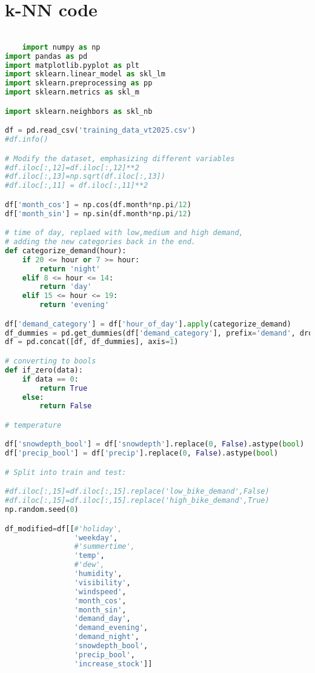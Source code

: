 \section*{k-NN code}
\begin{lstlisting}[language = Python]

    import numpy as np
import pandas as pd
import matplotlib.pyplot as plt
import sklearn.linear_model as skl_lm
import sklearn.preprocessing as pp
import sklearn.metrics as skl_m

import sklearn.neighbors as skl_nb

df = pd.read_csv('training_data_vt2025.csv')
#df.info()

# Modify the dataset, emphasizing different variables
#df.iloc[:,12]=df.iloc[:,12]**2
#df.iloc[:,13]=np.sqrt(df.iloc[:,13])
#df.iloc[:,11] = df.iloc[:,11]**2

df['month_cos'] = np.cos(df.month*np.pi/12)
df['month_sin'] = np.sin(df.month*np.pi/12)

# time of day, replaed with low,medium and high demand, 
# adding the new categories back in the end.
def categorize_demand(hour):
    if 20 <= hour or 7 >= hour:
        return 'night'
    elif 8 <= hour <= 14:
        return 'day'
    elif 15 <= hour <= 19:
        return 'evening'

df['demand_category'] = df['hour_of_day'].apply(categorize_demand)
df_dummies = pd.get_dummies(df['demand_category'], prefix='demand', drop_first=False)
df = pd.concat([df, df_dummies], axis=1)

# converting to bools
def if_zero(data):
    if data == 0:
        return True
    else:
        return False

# temperature

df['snowdepth_bool'] = df['snowdepth'].replace(0, False).astype(bool)
df['precip_bool'] = df['precip'].replace(0, False).astype(bool)

# Split into train and test:

#df.iloc[:,15]=df.iloc[:,15].replace('low_bike_demand',False)
#df.iloc[:,15]=df.iloc[:,15].replace('high_bike_demand',True)
np.random.seed(0)

df_modified=df[[#'holiday',
                'weekday',
                #'summertime',
                'temp',
                #'dew',
                'humidity',
                'visibility',
                'windspeed',
                'month_cos',
                'month_sin',
                'demand_day',
                'demand_evening',
                'demand_night',
                'snowdepth_bool',
                'precip_bool',
                'increase_stock']]


\end{lstlisting}
